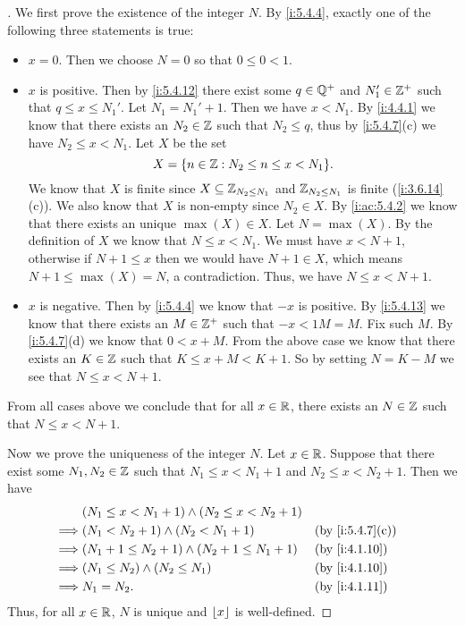 \begin{proof}[]
  We first prove the existence of the integer \(N\).
  By \cref{i:5.4.4}, exactly one of the following three statements is true:
  \begin{itemize}
    \item \(x = 0\).
          Then we choose \(N = 0\) so that \(0 \leq 0 < 1\).
    \item \(x\) is positive.
          Then by \cref{i:5.4.12} there exist some \(q \in \mathbb{Q}^+\) and \(N_1' \in \mathbb{Z}^+\) such that \(q \leq x \leq N_1'\).
          Let \(N_1 = N_1' + 1\).
          Then we have \(x < N_1\).
          By \cref{i:4.4.1} we know that there exists an \(N_2 \in \mathbb{Z}\) such that \(N_2 \leq q\), thus by \cref{i:5.4.7}(c) we have \(N_2 \leq x < N_1\).
          Let \(X\) be the set
          \[
            X = \set{n \in \Z : N_2 \leq n \leq x < N_1}.
          \]
          We know that \(X\) is finite since \(X \subseteq \mathbb{Z}_{N_2 \leq N_1}\) and \(\mathbb{Z}_{N_2 \leq N_1}\) is finite (\cref{i:3.6.14}(c)).
          We also know that \(X\) is non-empty since \(N_2 \in X\).
          By \cref{i:ac:5.4.2} we know that there exists an unique \(\max(X) \in X\).
          Let \(N = \max(X)\).
          By the definition of \(X\) we know that \(N \leq x < N_1\).
          We must have \(x < N + 1\), otherwise if \(N + 1 \leq x\) then we would have \(N + 1 \in X\), which means \(N + 1 \leq \max(X) = N\), a contradiction.
          Thus, we have \(N \leq x < N + 1\).
    \item \(x\) is negative.
          Then by \cref{i:5.4.4} we know that \(-x\) is positive.
          By \cref{i:5.4.13} we know that there exists an \(M \in \mathbb{Z}^+\) such that \(-x < 1M = M\).
          Fix such \(M\).
          By \cref{i:5.4.7}(d) we know that \(0 < x + M\).
          From the above case we know that there exists an \(K \in \mathbb{Z}\) such that \(K \leq x + M < K + 1\).
          So by setting \(N = K - M\) we see that \(N \leq x < N + 1\).
  \end{itemize}
  From all cases above we conclude that for all \(x \in \mathbb{R}\), there exists an \(N \in \mathbb{Z}\) such that \(N \leq x < N + 1\).

  Now we prove the uniqueness of the integer \(N\).
  Let \(x \in \mathbb{R}\).
  Suppose that there exist some \(N_1, N_2 \in \mathbb{Z}\) such that \(N_1 \leq x < N_1 + 1\) and \(N_2 \leq x < N_2 + 1\).
  Then we have
  \begin{align*}
             & (N_1 \leq x < N_1 + 1) \land (N_2 \leq x < N_2 + 1)                      \\
    \implies & (N_1 < N_2 + 1) \land (N_2 < N_1 + 1)               &  & \by{i:5.4.7}[c] \\
    \implies & (N_1 + 1 \leq N_2 + 1) \land (N_2 + 1 \leq N_1 + 1) &  & \by{i:4.1.10}   \\
    \implies & (N_1 \leq N_2) \land (N_2 \leq N_1)                 &  & \by{i:4.1.10}   \\
    \implies & N_1 = N_2.                                          &  & \by{i:4.1.11}
  \end{align*}
  Thus, for all \(x \in \mathbb{R}\), \(N\) is unique and \(\left\lfloor x\right\rfloor\) is well-defined.
\end{proof}

